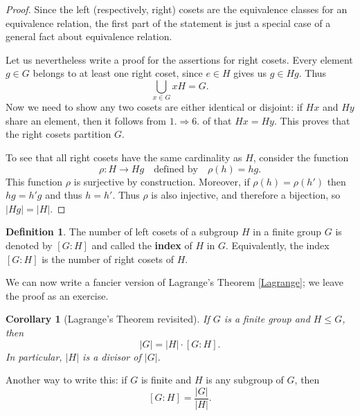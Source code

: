 \documentclass[12pt]{report}
\newtheorem{corollary}[theorem]{Corollary}
\numberwithin{equation}{section}
\numberwithin{theorem}{chapter}
\theoremstyle{definition}
\newtheorem{definition}[theorem]{Definition}
\newtheorem*{basic properties}{Basic Properties}
\newtheorem*{Important Remark}{Important Remark}
\newcommand{\df}[1]{{\bf #1}\index{#1}}
\begin{document}
\begin{proof}
Since the left (respectively, right) cosets are the equivalence classes for an equivalence relation, the first part of the statement is just a special case of a general fact about equivalence relation.

Let us nevertheless write a proof for the assertions for right cosets.
Every element $g \in G$ belongs to at least one right coset, since $e \in H$ gives us $g \in Hg$. Thus
$$\bigcup_{x\in G} xH=G.$$
Now we need to show any two cosets are either identical or disjoint: if $Hx$ and $Hy$ share an element, then it follows from $1.\Rightarrow 6.$ of  that $Hx=Hy$. This proves that the right cosets partition $G$. 


To see that all right cosets have the same cardinality as $H$, consider the function
$$\rho\!: H \to Hg \quad \textrm{defined by} \quad \rho(h) = hg.$$ 
This function $\rho$ is surjective by construction. Moreover, if $\rho(h) = \rho(h')$ then $hg = h'g$ and thus $h = h'$. Thus $\rho$ is also injective, and therefore a bijection, so $|Hg| = |H|$.
\end{proof}




\begin{definition}\label{definition of index}\index{$[G : H]$}
The number of left cosets of a subgroup $H$ in a finite group $G$ is denoted by $[G:H]$ and called the \df{index} of $H$ in $G$. Equivalently, the index $[G : H]$ is the number of right cosets of $H$.
\end{definition}


We can now write a fancier version of Lagrange's Theorem \ref{Lagrange}; we leave the proof as an exercise.

\begin{corollary}[Lagrange's Theorem revisited]
If $G$ is a finite group and $H \leq G$, then
$$|G| = |H| \cdot [G : H].$$
In particular, $|H|$ is a divisor of $|G|$.
\end{corollary}

Another way to write this: if $G$ is finite and $H$ is any subgroup of $G$, then 
$$[G:H]=\frac{|G|}{|H|}.$$
\end{document}
